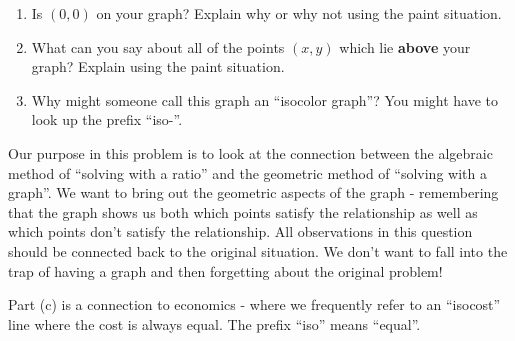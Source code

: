 \documentclass[nooutcomes, handout]{ximera}
\begin{document}
\begin{question}
\begin{enumerate}
    \item Is $(0,0)$ on your graph?  Explain why or why not using the paint situation.
    \item What can you say about all of the points $(x,y)$ which lie {\bf above} your graph?  Explain using the paint situation.
    \item Why might someone call this graph an ``isocolor graph''?  You might have to look up the prefix ``iso-''.
\end{enumerate}

\begin{instructorNotes}
Our purpose in this problem is to look at the connection between the algebraic method of ``solving with a ratio'' and the geometric method of ``solving with a graph''.  We want to bring out the geometric aspects of the graph - remembering that the graph shows us both which points satisfy the relationship as well as which points don't satisfy the relationship.  All observations in this question should be connected back to the original situation.  We don't want to fall into the trap of having a graph and then forgetting about the original problem!

Part (c) is a connection to economics - where we frequently refer to an ``isocost'' line where the cost is always equal.  The prefix ``iso'' means ``equal''.
\end{instructorNotes}
\end{question}

 
\end{document}
